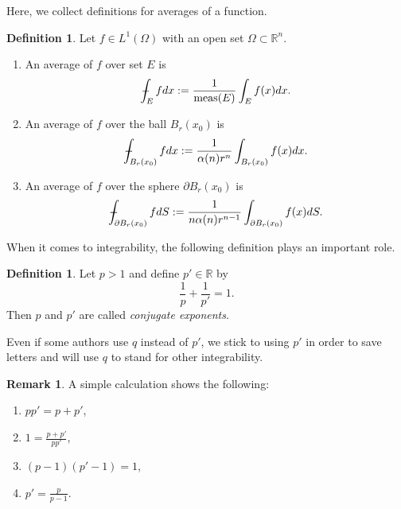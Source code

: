 \documentclass[11pt,a4paper]{report}
\theoremstyle{definition}
\newtheorem{definition}[theorem]{Definition}
\newtheorem{remark}[theorem]{Remark}
\def\Xint#1{\mathchoice
{\XXint\displaystyle\textstyle{#1}}%
{\XXint\textstyle\scriptstyle{#1}}%
{\XXint\scriptstyle\scriptscriptstyle{#1}}%
{\XXint\scriptscriptstyle\scriptscriptstyle{#1}}%
\!\int}
\def\XXint#1#2#3{{\setbox0=\hbox{$#1{#2#3}{\int}$}
\vcenter{\hbox{$#2#3$}}\kern-.5\wd0}}
\def\dashint{\Xint-}
\begin{document}
Here, we collect definitions for averages of a function.

\begin{definition}
	Let $f \in L^1(\Omega)$ with an open set $\Omega \subset \mathbb{R}^{n}$.
	\begin{enumerate}[label=(\alph*)] 
	\rm\item An average of $f$ over set $E$ is 
	\begin{equation*} 
		\dashint_{E} f d x:=\frac{1}{\operatorname{meas}(E)} \int_{E} f(x) d x.
	\end{equation*}
	\rm\item An average of $f$ over the ball $B_r(x_0)$ is 
	\begin{equation*} 
		\dashint_{B_r(x_0)} f d x:= \frac{1}{\alpha(n) r^{n}} \int_{B_r(x_0)} f(x) d x.
	\end{equation*}
	\rm\item An average of $f$ over the sphere $\partial B_r(x_0)$ is 
	\begin{equation*} 
		\dashint_{\partial B_r(x_0)} f d S :=\frac{1}{n\alpha(n) r^{n-1}} \int_{\partial B_r(x_0)} f(x) d S.
	\end{equation*}
	\end{enumerate}
\end{definition}

When it comes to integrability, the following definition plays an important role.

\begin{definition}
    Let $p>1$ and define $p' \in \mathbb{R}$ by 
    \begin{equation*} 
        \frac{1}{p} + \frac{1}{p'} = 1.
    \end{equation*}
    Then $p$ and $p'$ are called \emph{conjugate exponents}.
\end{definition}

Even if some authors use $q$ instead of $p'$, we stick to using $p'$ in order to save letters and will use $q$ to stand for other integrability. 

\begin{remark}
    A simple calculation shows the following:
    \begin{enumerate}[label=(\roman*)] 
    \rm\item $pp' = p + p'$,
    \rm\item $\displaystyle 1 = \frac{p+p'}{pp'}$,
    \rm\item $(p-1)(p'-1)=1$,
    \rm\item $\displaystyle p'= \frac{p}{p-1}$.
    \end{enumerate}
\end{remark}
\end{document}
